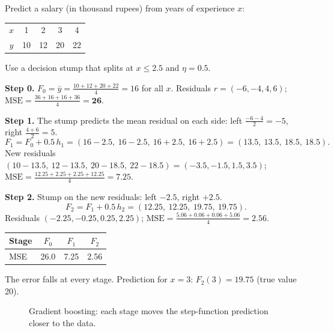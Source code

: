 \begin{example}
Predict a salary (in thousand rupees) from years of experience $x$:

\medskip
\begin{center}
\begin{tabular}{@{}c|cccc@{}}
\toprule
$x$ & 1 & 2 & 3 & 4\\
$y$ & 10 & 12 & 20 & 22\\
\bottomrule
\end{tabular}
\end{center}

\medskip
Use a decision stump that splits at $x\le2.5$ and $\eta=0.5$.

\medskip
\textbf{Step 0.} $F_0=\bar y=\frac{10+12+20+22}{4}=16$ for all $x$. Residuals $r=(-6,-4,4,6)$; $\text{MSE}=\frac{36+16+16+36}{4}=\mathbf{26}$.

\medskip
\textbf{Step 1.} The stump predicts the mean residual on each side: left $\frac{-6-4}{2}=-5$, right $\frac{4+6}{2}=5$.
\[
  F_1=F_0+0.5\,h_1=(16-2.5,\ 16-2.5,\ 16+2.5,\ 16+2.5)=(13.5,\ 13.5,\ 18.5,\ 18.5).
\]
New residuals $(10-13.5,\ 12-13.5,\ 20-18.5,\ 22-18.5)=(-3.5,-1.5,1.5,3.5)$; $\text{MSE}=\frac{12.25+2.25+2.25+12.25}{4}=\mathbf{7.25}$.

\medskip
\textbf{Step 2.} Stump on the new residuals: left $-2.5$, right $+2.5$.
\[
  F_2=F_1+0.5\,h_2=(12.25,\ 12.25,\ 19.75,\ 19.75).
\]
Residuals $(-2.25,-0.25,0.25,2.25)$; $\text{MSE}=\frac{5.06+0.06+0.06+5.06}{4}=\mathbf{2.56}$.

\medskip
\begin{center}
\begin{tabular}{@{}lccc@{}}
\toprule
\textbf{Stage} & $F_0$ & $F_1$ & $F_2$\\
\midrule
MSE & 26.0 & 7.25 & 2.56\\
\bottomrule
\end{tabular}
\end{center}
The error falls at every stage. Prediction for $x=3$: $F_2(3)=19.75$ (true value 20).
\end{example}

\begin{figure}[!htbp]
\centering
{}
\caption{Gradient boosting: each stage moves the step-function prediction closer to the data.}\label{fig:gbfit}
\end{figure}

